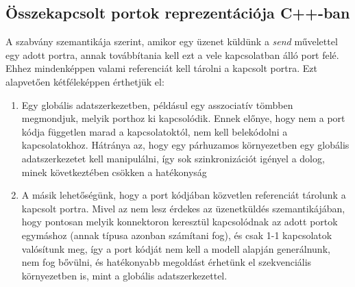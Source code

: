 \documentclass[a4paper,12pt]{report}
\begin{document}
\subsection{Összekapcsolt portok reprezentációja C++-ban} \label{conn_cpp}
A szabvány szemantikája szerint, amikor egy üzenet küldünk a \textit{send} művelettel egy adott portra, annak továbbítania kell ezt a vele kapcsolatban álló port felé. Ehhez mindenképpen valami referenciát kell tárolni a kapcsolt portra. Ezt alapvetően kétféleképpen érthetjük el:\\
\begin{enumerate}
\item Egy globális adatszerkezetben, példásul egy asszociatív tömbben megmondjuk, melyik porthoz ki kapcsolódik. Ennek előnye, hogy nem a port kódja független marad a kapcsolatoktól, nem kell belekódolni a kapcsolatokhoz.
Hátránya az, hogy egy párhuzamos környezetben egy globális adatszerkezetet kell manipulálni, így sok szinkronizációt igényel a dolog, minek következtében csökken a hatékonyság
\item A másik lehetőségünk, hogy a port kódjában közvetlen referenciát tárolunk a kapcsolt portra. Mivel az nem lesz érdekes az üzenetküldés szemantikájában, hogy pontosan melyik konnektoron keresztül kapcsolódnak az adott portok egymáshoz (annak típusa azonban számítani fog), és csak 1-1 kapcsolatok valósítunk meg, így a port kódját nem kell a modell alapján generálnunk, nem fog bővülni, és hatékonyabb megoldást érhetünk el szekvenciális környezetben is, mint a globális adatszerkezettel. 
\end{enumerate}
\end{document}
